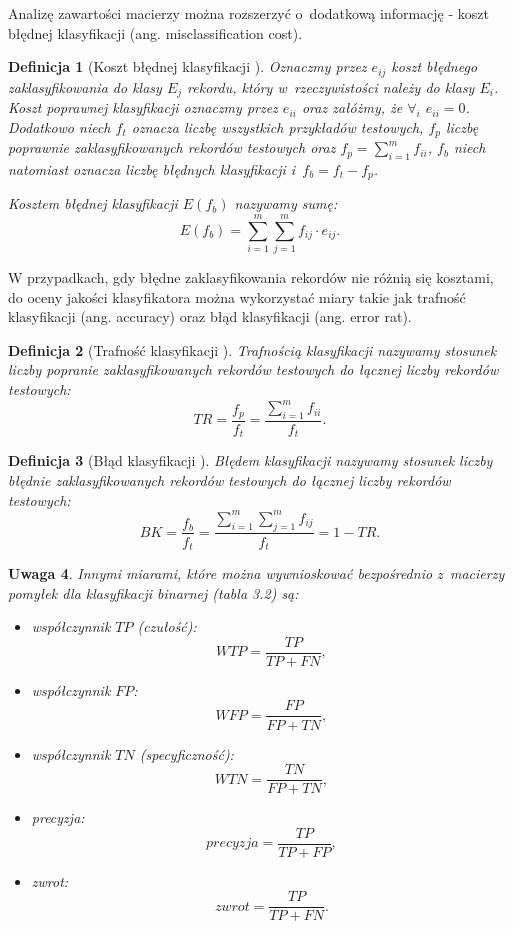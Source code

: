 \documentclass[12pt,a4paper]{report}
\newtheorem{df}{Definicja}[chapter]
\newtheorem{uwaga}[df]{Uwaga}
\begin{document}
Analizę zawartości macierzy można rozszerzyć o~dodatkową informację - koszt błędnej klasyfikacji (ang. misclassification cost).
\begin{df}[Koszt błędnej klasyfikacji {\citep[Sec 4.8.1]{edmia}}]
Oznaczmy przez $e_{ij}$ koszt błędnego zaklasyfikowania do klasy $E_j$ rekordu, który w~rzeczywistości należy do klasy $E_i$.
Koszt poprawnej klasyfikacji oznaczmy przez $e_{ii}$ oraz załóżmy, że $\forall_{i}$ $ e_{ii} = 0$.
Dodatkowo niech $f_{t}$ oznacza liczbę wszystkich przykładów testowych, $f_{p}$ liczbę poprawnie zaklasyfikowanych rekordów testowych oraz $f_{p} = \sum_{i=1}^m f_{ii}$, $f_{b}$ niech natomiast oznacza liczbę błędnych klasyfikacji i~$f_{b} = f_{t} - f_{p}$.

Kosztem błędnej klasyfikacji $E(f_{b})$ nazywamy sumę:
$$
E(f_{b}) = \sum_{i=1}^m \sum_{j=1}^m f_{ij} \cdot e_{ij}.
$$
\end{df}

W przypadkach, gdy błędne zaklasyfikowania rekordów nie różnią się kosztami, do oceny jakości klasyfikatora można wykorzystać miary takie jak trafność klasyfikacji (ang. accuracy) oraz błąd klasyfikacji (ang. error rat).
\begin{df}[Trafność klasyfikacji {\citep[Sec 4.8.1]{edmia}}]
Trafnością klasyfikacji nazywamy stosunek liczby popranie zaklasyfikowanych rekordów testowych do łącznej liczby rekordów testowych:
$$
TR= \frac{f_p}{f_t} = \frac{\sum_{i=1}^m f_{ii}}{f_t}.
$$
\end{df}
\begin{df}[Błąd klasyfikacji {\citep[Sec 4.8.1]{edmia}}]
Błędem klasyfikacji nazywamy stosunek liczby błędnie zaklasyfikowanych rekordów testowych do łącznej liczby rekordów testowych:
$$
BK = \frac{f_b}{f_t}=\frac{\sum_{i=1}^m \sum_{j=1}^m f_{ij}}{f_t}=1 - TR.
$$
\end{df}
\begin{uwaga}{\citep[Sec 4.8.1]{edmia}}
Innymi miarami, które można wywnioskować bezpośrednio z~macierzy pomyłek dla klasyfikacji binarnej (tabla 3.2) są:
\begin{itemize}
\item współczynnik $TP$ (czułość):
$$
WTP = \frac{TP}{TP + FN},
$$
\item współczynnik $FP$:
$$
WFP = \frac{FP}{FP + TN},
$$
\item współczynnik $TN$ (specyficzność):
$$
WTN = \frac{TN}{FP + TN},
$$
\item precyzja:
$$
precyzja = \frac{TP}{TP + FP},
$$
\item zwrot:
$$
zwrot = \frac{TP}{TP + FN}.
$$
\end{itemize}
\end{uwaga}
\end{document}
